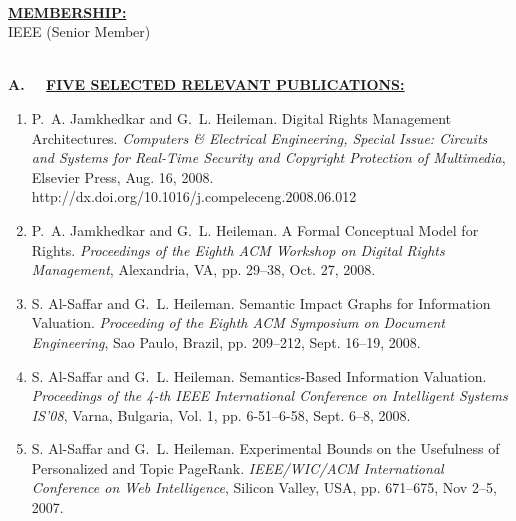 \documentclass [11pt]{article}
\begin{document}
{{{{\textcolor{black}{\makebox[6.5in]{\hrulefill}} ~\\
\underline{\bf MEMBERSHIP:} ~\\ 
IEEE (Senior Member)

{\textcolor{black}{\makebox[6.5in]{\hrulefill}} ~\\
{\bf A. \  \ \underline{FIVE SELECTED RELEVANT PUBLICATIONS:}}
\begin{enumerate}
\item P.~A. Jamkhedkar and G.~L. Heileman. Digital Rights Management Architectures. 
{\sl Computers \& Electrical Engineering, Special Issue: Circuits and Systems for Real-Time Security and Copyright Protection of Multimedia}, Elsevier Press, Aug. 16, 2008. ~\\
http://dx.doi.org/10.1016/j.compeleceng.2008.06.012

\item
P.~A. Jamkhedkar and G.~L. Heileman.  A Formal Conceptual Model for Rights.  {\sl Proceedings of the Eighth ACM Workshop on Digital Rights Management}, Alexandria, VA, pp. 29--38, Oct. 27, 2008. 

\item S. Al-Saffar and G.~L. Heileman. Semantic Impact Graphs for Information Valuation. {\sl Proceeding of the Eighth ACM Symposium on Document Engineering}, Sao Paulo, Brazil, pp. 209--212, Sept. 16--19, 2008.

\item S. Al-Saffar and G.~L. Heileman. Semantics-Based Information Valuation. {\sl Proceedings of the 4-th IEEE International Conference on Intelligent Systems IS'08}, Varna, Bulgaria, Vol. 1, pp. 6-51--6-58, Sept. 6--8, 2008.

\item S. Al-Saffar and G.~L. Heileman. Experimental Bounds on the Usefulness of Personalized and Topic PageRank. {\sl IEEE/WIC/ACM International Conference on Web Intelligence},
 Silicon Valley, USA, pp. 671--675, Nov 2--5, 2007.
 \end{enumerate} 

}}}}}
\end{document}
